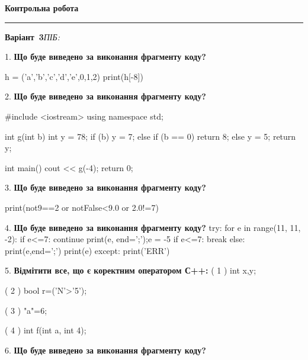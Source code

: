 \documentclass[11pt]{article}
\begin{document}
{\centering\Large\bfseries Контрольна робота\par}
\medskip
\noindent\rule{\linewidth}{0.5pt}
\smallskip
\noindent\textbf{Варіант \No\,3}\hfill \textit{ПІБ:}\,\underline{\hspace{60mm}}
\vspace{4mm}

1. \textbf{Що буде виведено за виконання фрагменту коду?}

h = ('a','b','c','d','e',0,1,2)
print(h[-8])

\par\vspace{5mm}

2. \textbf{Що буде виведено за виконання фрагменту коду?}

#include <iostream>
using namespace std;

int g(int b){
    int y = 78;
    if (b) 
        y = 7;
    else if (b == 0)
         return 8;
    else
         y = 5;
    return y;
}

int main(){
    cout << g(-4);
    return 0;
}

\par\vspace{5mm}

3. \textbf{Що буде виведено за виконання фрагменту коду?}

print(not9==2 or notFalse<9.0 or 2.0!=7)
\par\vspace{5mm}

4. \textbf{Що буде виведено за виконання фрагменту коду?}
try:
    for e in range(11, 11, -2):
        if e<=7:
            continue
        print(e, end=';');e = -5
        if e<=7:
            break
    else:
        print(e,end=';')
    print(e)
except:
    print('ERR')
\par\vspace{5mm}

5. %
\textbf{Відмітити все, що є коректним оператором С++:}
( 1 ) int x,y;

( 2 ) bool r=('N'>'5');

( 3 ) "a"=6;

( 4 ) int f(int a, int 4);
\par\vspace{5mm}

6. \textbf{Що буде виведено за виконання фрагменту коду?}
\end{document}
